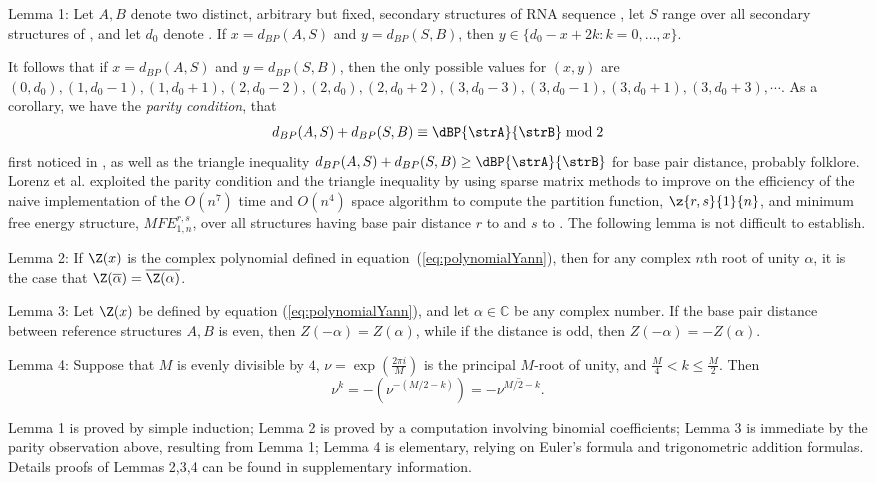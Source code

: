 \noindent
{\sc Lemma 1:} Let $A,B$ denote two distinct, arbitrary but fixed,
 secondary structures of RNA sequence \seq, let $S$ range over
all secondary structures of \seq, and let $d_0$ denote \dBP{\strA}{\strB}.
If $x=d_{BP}(A,S)$ and $y=d_{BP}(S,B)$, then
$y \in \{ d_0-x+2k: k=0,\ldots,x\}$.
\medskip

\noindent
It follows that if $x=d_{BP}(A,S)$ and $y=d_{BP}(S,B)$,
then the only possible values for
$(x,y)$ are $(0,d_0), (1,d_0-1), (1,d_0+1),
(2,d_0-2), (2,d_0), (2, d_0+2),
(3,d_0-3), (3,d_0-1), (3, d_0+1), (3,d_0+3), \cdots$.
As a corollary, we have the {\em parity condition}, that
\begin{eqnarray}
\label{eq:parity}
d_{BP}(A,S)+d_{BP}(S,B) \equiv \dBP{\strA}{\strB} \bmod 2
\end{eqnarray}
first noticed in \cite{hofacker:RNAbor2D}, as well as
the triangle inequality
$d_{BP}(A,S)+d_{BP}(S,B) \geq \dBP{\strA}{\strB}$
for base pair distance, probably folklore.
Lorenz et al. \cite{hofacker:RNAbor2D} exploited the parity condition
and the triangle inequality by using sparse matrix methods to improve on
the efficiency of the naive  implementation of the
$O(n^7)$ time and $O(n^4)$ space algorithm to compute
the partition function, $\z{r,s}{1}{n}$,
and minimum free energy structure, $MFE^{r,s}_{1,n}$, over all
structures having base pair distance $r$ to \strA and $s$ to \strB.
The following lemma is not difficult to establish.
\medskip

\noindent
{\sc Lemma 2:} If $\Z(x)$ is the complex polynomial defined in
equation~(\ref{eq:polynomialYann}), then for any complex $n$th root of
unity $\alpha$, it is the case that $\Z(\overline{\alpha}) =
\overline{\Z(\alpha)}$.
\medskip

\noindent
{\sc Lemma 3:}
Let $\Z(x)$ be defined by equation (\ref{eq:polynomialYann}), and
let $\alpha \in \mathbb{C}$ be any complex number.
If the base pair distance between reference
structures $A,B$ is even, then $Z(-\alpha)=Z(\alpha)$, while if
the distance is odd, then $Z(-\alpha)=-Z(\alpha)$.
\medskip

\noindent
{\sc Lemma 4:} Suppose that $M$ is evenly divisible by $4$,
$\nu = \exp(\frac{2 \pi i}{M})$ is the principal $M$-root of unity, and
$\frac{M}{4} < k \leq \frac{M}{2}$. Then
\[
\nu^k = -(\nu^{-(M/2-k)}) = - \overline{\nu^{M/2-k}}.
\]
\medskip

Lemma 1 is proved by simple induction; Lemma 2
is proved by a computation involving binomial coefficients;
Lemma 3 is immediate
by the parity observation above, resulting from Lemma 1;
Lemma 4 is elementary, relying on Euler's
formula and trigonometric addition formulas. Details proofs of
Lemmas 2,3,4 can be found in supplementary information.

